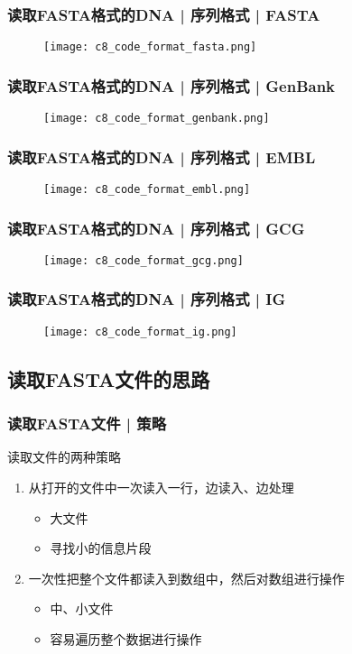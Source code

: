 \begin{frame}
  \frametitle{读取FASTA格式的DNA | 序列格式 | \alert{FASTA}}
  \begin{figure}
    \centering
    \texttt{[image: c8\_code\_format\_fasta.png]}
  \end{figure}
\end{frame}

\begin{frame}
  \frametitle{读取FASTA格式的DNA | 序列格式 | \alert{GenBank}}
  \begin{figure}
    \centering
    \texttt{[image: c8\_code\_format\_genbank.png]}
  \end{figure}
\end{frame}

\begin{frame}
  \frametitle{读取FASTA格式的DNA | 序列格式 | \alert{EMBL}}
  \begin{figure}
    \centering
    \texttt{[image: c8\_code\_format\_embl.png]}
  \end{figure}
\end{frame}

\begin{frame}
  \frametitle{读取FASTA格式的DNA | 序列格式 | GCG}
  \begin{figure}
    \centering
    \texttt{[image: c8\_code\_format\_gcg.png]}
  \end{figure}
\end{frame}

\begin{frame}
  \frametitle{读取FASTA格式的DNA | 序列格式 | IG}
  \begin{figure}
    \centering
    \texttt{[image: c8\_code\_format\_ig.png]}
  \end{figure}
\end{frame}

\subsection{读取FASTA文件的思路}
\begin{frame}
  \frametitle{读取FASTA文件 | \alert{策略}}
  \begin{block}{读取文件的两种策略}
    \begin{enumerate}
      \item 从打开的文件中一次读入一行，边读入、边处理
	\begin{itemize}
	  \item 大文件
	  \item 寻找小的信息片段
	\end{itemize}
      \item 一次性把整个文件都读入到数组中，然后对数组进行操作
	\begin{itemize}
	  \item 中、小文件
	  \item 容易遍历整个数据进行操作
	\end{itemize}
    \end{enumerate}
  \end{block}
\end{frame}

